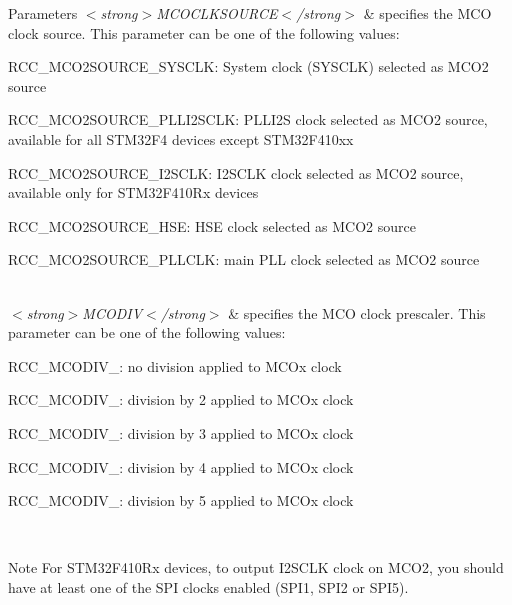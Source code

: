 \begin{DoxyParams}{Parameters}
{\em $<$strong$>$\+M\+C\+O\+C\+L\+K\+S\+O\+U\+R\+C\+E$<$/strong$>$} & specifies the M\+CO clock source. This parameter can be one of the following values\+: \begin{DoxyItemize}
\item R\+C\+C\+\_\+\+M\+C\+O2\+S\+O\+U\+R\+C\+E\+\_\+\+S\+Y\+S\+C\+LK\+: System clock (S\+Y\+S\+C\+LK) selected as M\+C\+O2 source \item R\+C\+C\+\_\+\+M\+C\+O2\+S\+O\+U\+R\+C\+E\+\_\+\+P\+L\+L\+I2\+S\+C\+LK\+: P\+L\+L\+I2S clock selected as M\+C\+O2 source, available for all S\+T\+M32\+F4 devices except S\+T\+M32\+F410xx \item R\+C\+C\+\_\+\+M\+C\+O2\+S\+O\+U\+R\+C\+E\+\_\+\+I2\+S\+C\+LK\+: I2\+S\+C\+LK clock selected as M\+C\+O2 source, available only for S\+T\+M32\+F410\+Rx devices \item R\+C\+C\+\_\+\+M\+C\+O2\+S\+O\+U\+R\+C\+E\+\_\+\+H\+SE\+: H\+SE clock selected as M\+C\+O2 source \item R\+C\+C\+\_\+\+M\+C\+O2\+S\+O\+U\+R\+C\+E\+\_\+\+P\+L\+L\+C\+LK\+: main P\+LL clock selected as M\+C\+O2 source \end{DoxyItemize}
\\
\hline
{\em $<$strong$>$\+M\+C\+O\+D\+I\+V$<$/strong$>$} & specifies the M\+CO clock prescaler. This parameter can be one of the following values\+: \begin{DoxyItemize}
\item R\+C\+C\+\_\+\+M\+C\+O\+D\+I\+V\+\_\+: no division applied to M\+C\+Ox clock \item R\+C\+C\+\_\+\+M\+C\+O\+D\+I\+V\+\_\+: division by 2 applied to M\+C\+Ox clock \item R\+C\+C\+\_\+\+M\+C\+O\+D\+I\+V\+\_\+: division by 3 applied to M\+C\+Ox clock \item R\+C\+C\+\_\+\+M\+C\+O\+D\+I\+V\+\_\+: division by 4 applied to M\+C\+Ox clock \item R\+C\+C\+\_\+\+M\+C\+O\+D\+I\+V\+\_\+: division by 5 applied to M\+C\+Ox clock \end{DoxyItemize}
\\
\hline
\end{DoxyParams}
\begin{DoxyNote}{Note}
For S\+T\+M32\+F410\+Rx devices, to output I2\+S\+C\+LK clock on M\+C\+O2, you should have at least one of the S\+PI clocks enabled (S\+P\+I1, S\+P\+I2 or S\+P\+I5). 
\end{DoxyNote}
